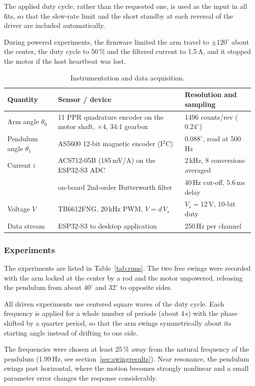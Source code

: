 \documentclass[a4paper,11pt]{article}
\begin{document}
The applied duty cycle, rather than the requested one, is used as the input in all fits, so that the slew-rate limit and the short standby at each reversal of the driver are included automatically.

During powered experiments, the firmware limited the arm travel to $\pm 120^\circ$ about the center, the duty cycle to 50\,\% and the filtered current to 1.5\,A, and it stopped the motor if the host heartbeat was lost.

\begin{table}[h]
\centering
\caption{Instrumentation and data acquisition.}
\label{tab:setup}
\small
\begin{tabular}{@{}p{2.6cm}p{6.9cm}p{5.2cm}@{}}
\toprule
Quantity & Sensor / device & Resolution and sampling \\
\midrule
Arm angle $\theta_0$ & 11 PPR quadrature encoder on the motor shaft, $\times 4$, 34:1 gearbox & 1496 counts/rev ($0.24^\circ$) \\
Pendulum angle $\theta_1$ & AS5600 12-bit magnetic encoder (I$^2$C) & $0.088^\circ$, read at 500\,Hz \\
Current $i$ & ACS712-05B (185\,mV/A) on the ESP32-S3 ADC & 2\,kHz, 8 conversions averaged \\
 & on-board 2nd-order Butterworth filter & 40\,Hz cut-off, 5.6\,ms delay \\
Voltage $V$ & TB6612FNG, 20\,kHz PWM, $V = d\,V_s$ & $V_s = 12\,\mathrm{V}$, 10-bit duty \\
Data stream & ESP32-S3 to desktop application & 250\,Hz per channel \\
\bottomrule
\end{tabular}
\end{table}

\subsubsection{Experiments}
The experiments are listed in Table~\ref{tab:runs}. The two free swings were recorded with the arm locked at the center by a rod and the motor unpowered, releasing the pendulum from about $40^\circ$ and $32^\circ$ to opposite sides.

All driven experiments use centered square waves of the duty cycle. Each frequency is applied for a whole number of periods (about 4\,s) with the phase shifted by a quarter period, so that the arm swings symmetrically about its starting angle instead of drifting to one side.

The frequencies were chosen at least 25\,\% away from the natural frequency of the pendulum (1.99\,Hz, see section~\ref{sec:swingresults}). Near resonance, the pendulum swings past horizontal, where the motion becomes strongly nonlinear and a small parameter error changes the response considerably.
\end{document}
